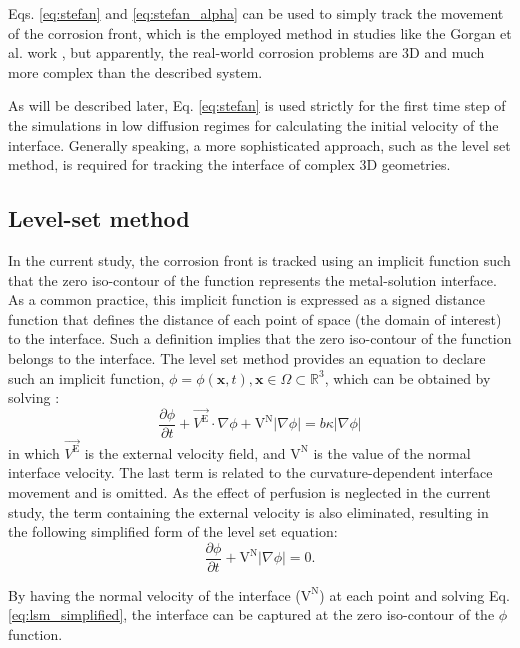 Eqs. \ref{eq:stefan} and \ref{eq:stefan_alpha} can be used to simply track the movement of the corrosion front, which is the employed method in studies like the Gorgan et al. work \cite{Grogan2014}, but apparently, the real-world corrosion problems are 3D and much more complex than the described system.

As will be described later, Eq. \ref{eq:stefan} is used strictly for the first time step of the simulations in low diffusion regimes for calculating the initial velocity of the interface. Generally speaking, a more sophisticated approach, such as the level set method, is required for tracking the interface of complex 3D geometries.

\subsection{Level-set method}

In the current study, the corrosion front is tracked using an implicit function such that the zero iso-contour of the function represents the metal-solution interface. As a common practice, this implicit function is expressed as a signed distance function that defines the distance of each point of space (the domain of interest) to the interface. Such a definition implies that the zero iso-contour of the function belongs to the interface. The level set method provides an equation to declare such an implicit function, $\phi=\phi(\mathbf{x},t), \mathbf{x} \in \Omega \subset \mathbb{R}^{3}$, which can be obtained by solving \cite{RonaldFedkiw2002}:
\begin{equation} \label{eq:lsm_full}
\frac{\partial \phi}{\partial t}+{\overrightarrow{V^\mathrm{E}} \cdot \nabla \phi}+{\mathrm{V}^\mathrm{N}|\nabla \phi|}={b \kappa|\nabla \phi|}
\end{equation}
in which $\overrightarrow{V^\mathrm{E}}$ is the external velocity field, and  $\mathrm{V}^\mathrm{N}$ is the value of the normal interface velocity. The last term is related to the curvature-dependent interface movement and is omitted. As the effect of perfusion is neglected in the current study, the term containing the external velocity is also eliminated, resulting in the following simplified form of the level set equation:
\begin{equation} \label{eq:lsm_simplified}
\frac{\partial \phi}{\partial t}+\mathrm{V}^\mathrm{N}|\nabla \phi|=0.
\end{equation}

By having the normal velocity of the interface ($\mathrm{V}^\mathrm{N}$) at each point and solving Eq. \ref{eq:lsm_simplified}, the interface can be captured at the zero iso-contour of the $\phi$ function.


